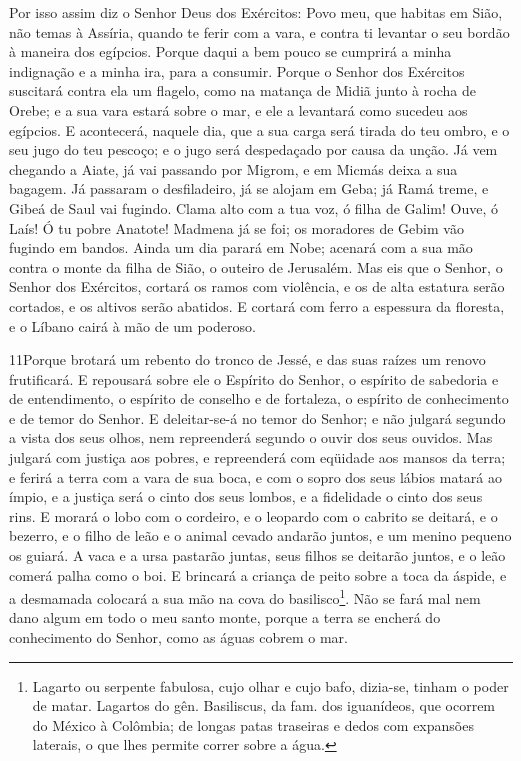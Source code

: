 Por isso assim diz o Senhor Deus dos Exércitos: Povo meu, que
habitas em Sião, não temas à Assíria, quando te ferir com a vara, e
contra ti levantar o seu bordão à maneira dos egípcios.
Porque daqui a bem pouco se cumprirá a minha indignação e a
minha ira, para a consumir. Porque o Senhor dos Exércitos
suscitará contra ela um flagelo, como na matança de Midiã junto à
rocha de Orebe; e a sua vara estará sobre o mar, e ele a levantará
como sucedeu aos egípcios. E acontecerá, naquele dia, que a
sua carga será tirada do teu ombro, e o seu jugo do teu pescoço; e o
jugo será despedaçado por causa da unção. Já vem chegando a
Aiate, já vai passando por Migrom, e em Micmás deixa a sua bagagem.
Já passaram o desfiladeiro, já se alojam em Geba; já Ramá
treme, e Gibeá de Saul vai fugindo. Clama alto com a tua voz,
ó filha de Galim! Ouve, ó Laís! Ó tu pobre Anatote! Madmena
já se foi; os moradores de Gebim vão fugindo em bandos. Ainda
um dia parará em Nobe; acenará com a sua mão contra o monte da filha
de Sião, o outeiro de Jerusalém. Mas eis que o Senhor, o
Senhor dos Exércitos, cortará os ramos com violência, e os de alta
estatura serão cortados, e os altivos serão abatidos. E
cortará com ferro a espessura da floresta, e o Líbano cairá à mão de
um poderoso.

\medskip

\lettrine{11}{}Porque brotará um rebento do tronco de Jessé, e
das suas raízes um renovo frutificará. E repousará sobre ele o
Espírito do Senhor, o espírito de sabedoria e de entendimento, o
espírito de conselho e de fortaleza, o espírito de conhecimento e de
temor do Senhor. E deleitar-se-á no temor do Senhor; e não
julgará segundo a vista dos seus olhos, nem repreenderá segundo o
ouvir dos seus ouvidos. Mas julgará com justiça aos pobres, e
repreenderá com eqüidade aos mansos da terra; e ferirá a terra com a
vara de sua boca, e com o sopro dos seus lábios matará ao ímpio,
e a justiça será o cinto dos seus lombos, e a fidelidade o cinto
dos seus rins. E morará o lobo com o cordeiro, e o leopardo com
o cabrito se deitará, e o bezerro, e o filho de leão e o animal
cevado andarão juntos, e um menino pequeno os guiará. A vaca e a
ursa pastarão juntas, seus filhos se deitarão juntos, e o leão
comerá palha como o boi. E brincará a criança de peito sobre a
toca da áspide, e a desmamada colocará a sua mão na cova do
basilisco\footnote{Lagarto ou serpente fabulosa, cujo olhar e cujo
bafo, dizia-se, tinham o poder de matar. Lagartos do gên.
Basiliscus, da fam. dos iguanídeos, que ocorrem do México à
Colômbia; de longas patas traseiras e dedos com expansões laterais,
o que lhes permite correr sobre a água.}. Não se fará mal nem
dano algum em todo o meu santo monte, porque a terra se encherá do
conhecimento do Senhor, como as águas cobrem o mar.

